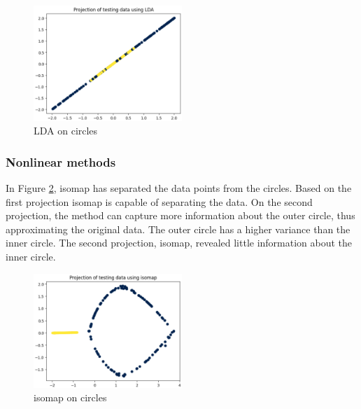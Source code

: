 \begin{figure}[htb!]
    \centering
    \includegraphics[width=0.5\textwidth]{figures/theory-example-figures/circles-lda.png}
    \caption{LDA on circles}
    \label{fig:circles-lda}
\end{figure}

\subsubsection{Nonlinear methods}\label{subsubsec:nonlinear-methods-on-circles}
In Figure \ref{fig:circles-isomap}, \gls{isomap} has separated the data points from the circles. Based on the first projection \gls{isomap} is capable of separating the data. On the second projection, the method can capture more information about the outer circle, thus approximating the original data. The outer circle has a higher variance than the inner circle. The second projection, \gls{isomap}, revealed little information about the inner circle.
\begin{figure}[htb!]
    \centering
    \includegraphics[width=0.5\textwidth]{figures/theory-example-figures/circles-isomap.png}
    \caption{\gls{isomap} on circles}
    \label{fig:circles-isomap}
\end{figure}


